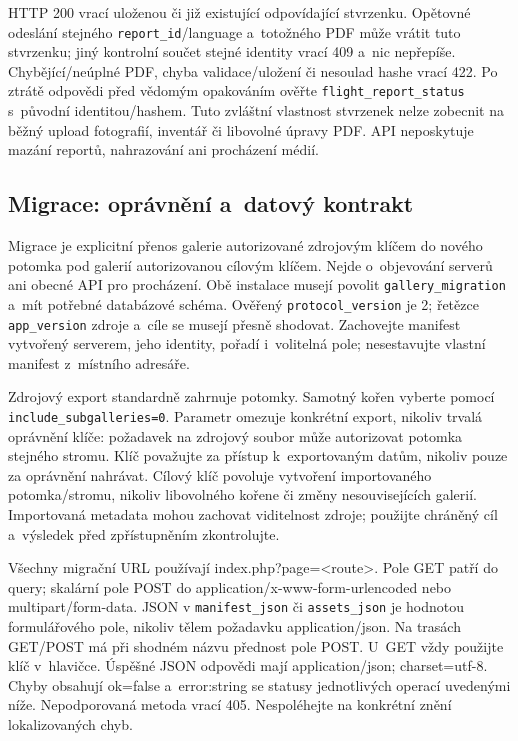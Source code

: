 \documentclass[11pt,a4paper]{article}
\newcommand{\codeword}[1]{\nolinkurl{#1}}
\begin{document}
HTTP 200 vrací uloženou či již existující odpovídající stvrzenku. Opětovné odeslání stejného
\codeword{report_id}/language a~totožného PDF může vrátit tuto stvrzenku; jiný kontrolní
součet stejné identity vrací 409 a~nic nepřepíše. Chybějící/neúplné PDF, chyba
validace/uložení či nesoulad hashe vrací 422. Po ztrátě odpovědi před vědomým opakováním
ověřte \codeword{flight_report_status} s~původní identitou/hashem. Tuto zvláštní vlastnost
stvrzenek nelze zobecnit na běžný upload fotografií, inventář či libovolné úpravy PDF. API
neposkytuje mazání reportů, nahrazování ani procházení médií.

\subsection{\texorpdfstring{Migrace: oprávnění a~datový kontrakt}{Migrace: oprávnění a datový kontrakt}}

\label{api352:migration-contract}

Migrace je explicitní přenos galerie autorizované zdrojovým klíčem do nového potomka pod
galerií autorizovanou cílovým klíčem. Nejde o~objevování serverů ani obecné API pro
procházení. Obě instalace musejí povolit \codeword{gallery_migration} a~mít potřebné
databázové schéma. Ověřený \codeword{protocol_version} je 2; řetězce \codeword{app_version}
zdroje a~cíle se musejí přesně shodovat. Zachovejte manifest vytvořený serverem, jeho
identity, pořadí i~volitelná pole; nesestavujte vlastní manifest z~místního adresáře.

Zdrojový export standardně zahrnuje potomky. Samotný kořen vyberte pomocí
\codeword{include_subgalleries=0}. Parametr omezuje konkrétní export, nikoliv trvalá
oprávnění klíče: požadavek na zdrojový soubor může autorizovat potomka stejného stromu. Klíč
považujte za přístup k~exportovaným datům, nikoliv pouze za oprávnění nahrávat. Cílový klíč
povoluje vytvoření importovaného potomka/stromu, nikoliv libovolného kořene či změny
nesouvisejících galerií. Importovaná metadata mohou zachovat viditelnost zdroje; použijte
chráněný cíl a~výsledek před zpřístupněním zkontrolujte.

Všechny migrační URL používají index.php?page=<route>. Pole GET patří do query; skalární
pole POST do application/x-www-form-urlencoded nebo multipart/form-data. JSON v
\codeword{manifest_json} či \codeword{assets_json} je hodnotou formulářového pole, nikoliv
tělem požadavku application/json. Na trasách GET/POST má při shodném názvu přednost pole
POST. U~GET vždy použijte klíč v~hlavičce. Úspěšné JSON odpovědi mají application/json;
charset=utf-8. Chyby obsahují ok=false a~error:string se statusy jednotlivých operací
uvedenými níže. Nepodporovaná metoda vrací 405. Nespoléhejte na konkrétní znění
lokalizovaných chyb.
\end{document}
